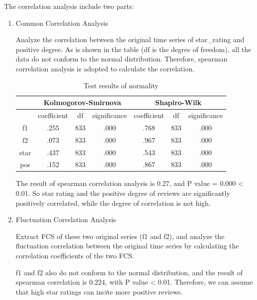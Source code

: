 \documentclass{mcmthesis}
\begin{document}
The correlation analysis include two parts: 
\begin{enumerate}[leftmargin=*,fullwidth,itemindent=2em,label=(\arabic*)]
\item{Common Correlation Analysis}

\quad \quad Analyze the correlation between the original time series of star\_rating and positive degree. As is shown in the table (df is the degree of freedom), all the data do not conform to the normal distribution. Therefore, spearman correlation analysis is adopted to calculate the correlation.

\begin{longtable}[c]{ccccccc}
\caption{Test results of normality}\\
\toprule
     & \multicolumn{3}{c}{Kolmogorov-Smirnova} & \multicolumn{3}{c}{Shapiro-Wilk} \\
\midrule
\endhead
\bottomrule
\endfoot
     & coefficient    & df    & significance   & coefficient & df  & significance \\ \hline
f1   & .255           & 833   & .000           & .768        & 833 & .000         \\
f2   & .073           & 833   & .000           & .967        & 833 & .000         \\
star & .437           & 833   & .000           & .543        & 833 & .000         \\
pos  & .152           & 833   & .000           & .867        & 833 & .000         \\
\end{longtable}

\quad \quad The result of spearman correlation analysis is 0.27, and P value = 0.000 < 0.01. So star rating and the positive degree of reviews are significantly positively correlated, while the degree of correlation is not high.

\item{Fluctuation Correlation Analysis}

\quad \quad Extract FCS of these two original series (f1 and f2), and analyze the fluctuation correlation between the original time series by calculating the correlation coefficients of the two FCS.

\quad \quad f1 and f2 also do not conform to the normal distribution, and the result of spearman correlation is 0.224, with P value < 0.01. Therefore, we can assume that high star ratings can incite more positive reviews.


\end{enumerate}
\end{document}

